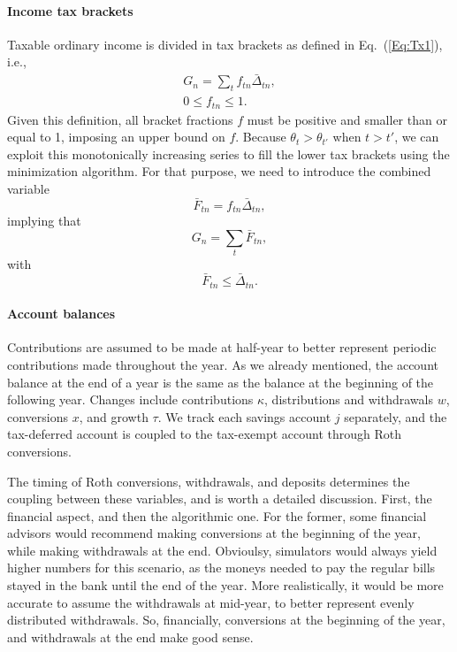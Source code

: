 \documentclass{article}[fleqn,12pt]
\begin{document}
\paragraph*{Income tax brackets}
	Taxable ordinary income is divided in tax brackets as defined in Eq.~(\ref{Eq:Tx1}), i.e.,
	\begin{eqnarray}
		\label{Eq:C2}
		G_n = \sum_t f_{tn}\bar{\Delta}_{tn} ,\nonumber\\
		0 \leq f_{tn} \leq 1.
	\end{eqnarray}
	Given this definition, all bracket fractions $f$ must be positive and smaller than or equal to 1,
	imposing an upper bound on $f$.
	Because $\theta_{t} > \theta_{t'}$ when $t > t'$, we can exploit
	this monotonically increasing series to fill the lower
	tax brackets using the minimization algorithm.
	For that purpose, we need to introduce the combined variable
	\begin{equation}
		\bar{F}_{tn} = f_{tn}\bar{\Delta}_{tn},
	\end{equation}
	implying that
	\begin{equation}
		G_n = \sum_t \bar{F}_{tn},
	\end{equation}
	with
	\begin{equation}
		\bar{F}_{tn} \le \bar{\Delta}_{tn}.
	\end{equation}

\paragraph*{Account balances}
	Contributions are assumed to be made at half-year to better represent periodic contributions
	made throughout the year. As we already mentioned,
	the account balance at the end of a year is the same as the balance
	at the beginning of the following year.
	Changes include contributions $\kappa$, distributions and withdrawals $w$,
	conversions $x$, and growth $\tau$.
	We track each savings account $j$ separately, and the tax-deferred account
	is coupled to the tax-exempt account through Roth conversions.

	The timing of Roth conversions, withdrawals, and deposits determines
	the coupling between these variables, and is worth a detailed discussion.
	First, the financial aspect, and then the algorithmic one.
	For the former, some financial advisors would recommend making
	conversions at the beginning of the year, while making withdrawals
	at the end. Obvioulsy, simulators would always yield higher numbers
	for this scenario, as the moneys needed to pay the regular bills 
	stayed in the bank until the end of the year. More realistically,
	it would be more accurate to assume the withdrawals at mid-year,
	to better represent evenly distributed withdrawals. So, financially,
	conversions at the beginning of the year, and withdrawals at the end
	make good sense.
\end{document}
